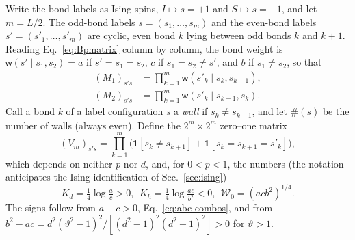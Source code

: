 \documentclass[aps,prx,reprint,superscriptaddress,nobibnotes,longbibliography]{revtex4-2}
\theoremstyle{remark}
\newcommand{\vth}{\vartheta}
\newcommand{\Iv}[1]{\mathbf 1[#1]}
\begin{document}
Write the bond labels as Ising spins, $I\mapsto s=+1$ and $S\mapsto s=-1$, and let $m=L/2$.  The odd-bond labels $s=(s_1,\ldots,s_m)$ and the even-bond labels $s'=(s'_1,\ldots,s'_m)$ are cyclic, even bond $k$ lying between odd bonds $k$ and $k+1$.  Reading Eq.~\eqref{eq:Bpmatrix} column by column, the bond weight is
$\mathsf w(s'\mid s_1,s_2)=a$ if $s'=s_1=s_2$, $c$ if $s_1=s_2\ne s'$, and $b$ if $s_1\ne s_2$, so that
\begin{align}
 (M_1)_{s's}&=\prod_{k=1}^m\mathsf w(s'_k\mid s_k,s_{k+1}),\nonumber\\
 (M_2)_{s's}&=\prod_{k=1}^m\mathsf w(s'_k\mid s_{k-1},s_k).
 \label{eq:M1M2}
\end{align}
Call a bond $k$ of a label configuration $s$ a \emph{wall} if $s_k\ne s_{k+1}$, and let $\#(s)$ be the number of walls (always even).  Define the $2^m\times2^m$ zero--one matrix
\begin{equation}
 (V_m)_{s's}=\prod_{k=1}^m\bigl(\Iv{s_k\ne s_{k+1}}+\Iv{s_k=s_{k+1}=s'_k}\bigr),
 \label{eq:Vdef}
\end{equation}
which depends on neither $p$ nor $d$, and, for $0<p<1$, the numbers (the notation anticipates the Ising identification of Sec.~\ref{sec:ising})
\begin{equation}
 K_d=\tfrac14\log\tfrac ac>0,\ \ K_h=\tfrac14\log\tfrac{ac}{b^2}<0,\ \ \mathcal W_0=(acb^2)^{1/4}.
 \label{eq:Kdh}
\end{equation}
The signs follow from $a-c>0$, Eq.~\eqref{eq:abc-combos}, and from $b^2-ac=d^2(\vth^2-1)^2/[(d^2-1)^2(d^2+1)^2]>0$ for $\vth>1$.
\end{document}
